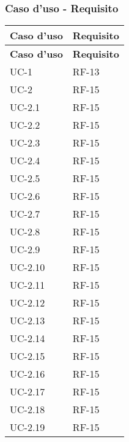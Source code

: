 \subsubsection{Caso d'uso - Requisito}
\begin{longtable}{|>{\centering\arraybackslash}m{}|>{\centering\arraybackslash}m{}|}
	\hline
	\textbf{Caso d'uso} & \textbf{Requisito}      \\\hline
	\endfirsthead
	\hline
	\textbf{Caso d'uso} & \textbf{Requisito}      \\\hline
	\endhead
	UC-1                & RF-13                   \\\hline
	UC-2                & RF-15                   \\\hline
	UC-2.1              & RF-15                   \\\hline
	UC-2.2              & RF-15                   \\\hline
	UC-2.3              & RF-15                   \\\hline
	UC-2.4              & RF-15                   \\\hline
	UC-2.5              & RF-15                   \\\hline
	UC-2.6              & RF-15                   \\\hline
	UC-2.7              & RF-15                   \\\hline
	UC-2.8              & RF-15                   \\\hline
	UC-2.9              & RF-15                   \\\hline
	UC-2.10             & RF-15                   \\\hline
	UC-2.11             & RF-15                   \\\hline
	UC-2.12             & RF-15                   \\\hline
	UC-2.13             & RF-15                   \\\hline
	UC-2.14             & RF-15                   \\\hline
	UC-2.15             & RF-15                   \\\hline
	UC-2.16             & RF-15                   \\\hline
	UC-2.17             & RF-15                   \\\hline
	UC-2.18             & RF-15                   \\\hline
	UC-2.19             & RF-15                   \\\hline

\end{longtable}
